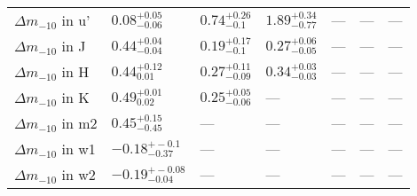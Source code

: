 \begin{tabular}{lllllll}
${\Delta m}_{-10}$ in u' &    $0.08_{-0.06}^{+0.05}$ &   $0.74_{-0.1}^{+0.26}$ &  $1.89_{-0.77}^{+0.34}$ &                     --- &                     --- &                     --- \\
${\Delta m}_{-10}$ in J  &    $0.44_{-0.04}^{+0.04}$ &   $0.19_{-0.1}^{+0.17}$ &  $0.27_{-0.05}^{+0.06}$ &                     --- &                     --- &                     --- \\
${\Delta m}_{-10}$ in H  &     $0.44_{0.01}^{+0.12}$ &  $0.27_{-0.09}^{+0.11}$ &  $0.34_{-0.03}^{+0.03}$ &                     --- &                     --- &                     --- \\
${\Delta m}_{-10}$ in K  &     $0.49_{0.02}^{+0.01}$ &  $0.25_{-0.06}^{+0.05}$ &                     --- &                     --- &                     --- &                     --- \\
${\Delta m}_{-10}$ in m2 &    $0.45_{-0.45}^{+0.15}$ &                     --- &                     --- &                     --- &                     --- &                     --- \\
${\Delta m}_{-10}$ in w1 &   $-0.18_{-0.37}^{+-0.1}$ &                     --- &                     --- &                     --- &                     --- &                     --- \\
${\Delta m}_{-10}$ in w2 &  $-0.19_{-0.04}^{+-0.08}$ &                     --- &                     --- &                     --- &                     --- &                     --- \\
\bottomrule
\end{tabular}
